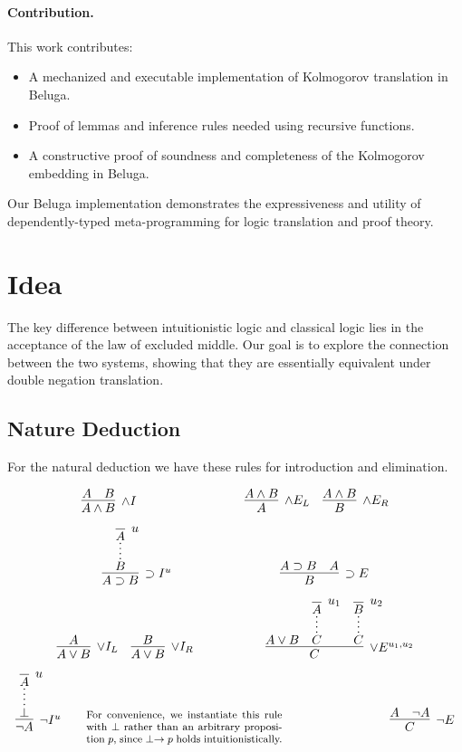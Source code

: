 \documentclass{article}
\begin{document}
\paragraph{Contribution.} This work contributes:
\begin{itemize}
    \item A mechanized and executable implementation of Kolmogorov translation in Beluga.
    \item Proof of lemmas and inference rules needed using recursive functions.
    \item A constructive proof of soundness and completeness of the Kolmogorov embedding in Beluga.
\end{itemize}
Our Beluga implementation demonstrates the expressiveness and utility of dependently-typed meta-programming for logic translation and proof theory.

\section{Idea}

The key difference between intuitionistic logic and classical logic lies in the acceptance of the law of excluded middle. Our goal is to explore the connection between the two systems, showing that they are essentially equivalent under double negation translation.


\subsection{Nature Deduction}
For the natural deduction we have these rules for
 introduction and elimination.

\[
\infer[\land I]{A \land B}{A & B}
\hspace{3cm}
\infer[\land E_L]{A}{A \land B}
\quad
\infer[\land E_R]{B}{A \land B}
\]


\[
\infer[\supset I^u]{A \supset B}{
  \infer*{B}{\infer [u]{A}{}}
}
\hspace{3cm}
\infer[\supset E]{B}{A \supset B & A}
\]



\[
\infer[\lor I_L]{A \lor B}{A}
\quad
\infer[\lor I_R]{A \lor B}{B}
\hspace{2cm}
\infer[\lor E^{u_1, u_2}]{C}{
  A \lor B
  \quad
  \infer*{C}{\infer[u_1]{A}{}}
  \quad
  \infer*{C}{\infer[u_2]{B}{}}
}
\]

\[
\infer[\neg I^{u}]{\neg A}{
  \infer*{\perp}{\infer[u]{A}{}}
}
\qquad
\parbox{0.45\linewidth}{\footnotesize
  For convenience, we instantiate this rule with $\perp$ rather than an arbitrary proposition $p$, since $\perp \rightarrow p$ holds intuitionistically.
}
\hspace{3cm}
\infer[\neg E]{C}{
   A & \neg A
}
\]
\end{document}
